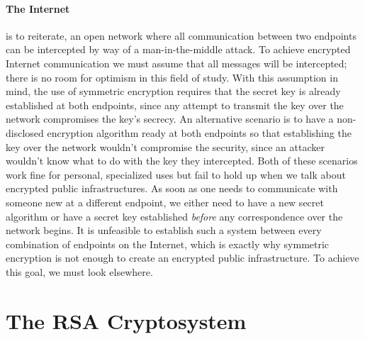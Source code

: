 \documentclass[12pt]{article}
\theoremstyle{remark}
\begin{document}
\paragraph{The Internet} is to reiterate, an open network where all communication between two endpoints can be intercepted by way of a man-in-the-middle attack.  To achieve encrypted Internet communication we must assume that all messages will be intercepted; there is no room for optimism in this field of study.  With this assumption in mind, the use of symmetric encryption requires that the secret key is already established at both endpoints, since any attempt to transmit the key over the network compromises the key's secrecy.  An alternative scenario is to have a non-disclosed encryption algorithm ready at both endpoints so that establishing the key over the network wouldn't compromise the security, since an attacker wouldn't know what to do with the key they intercepted.  Both of these scenarios work fine for personal, specialized uses but fail to hold up when we talk about encrypted public infrastructures.  As soon as one needs to communicate with someone new at a different endpoint, we either need to have a new secret algorithm or have a secret key established \textit{before} any correspondence over the network begins.  It is unfeasible to establish such a system between every combination of endpoints on the Internet, which is exactly why symmetric encryption is not enough to create an encrypted public infrastructure.  To achieve this goal, we must look elsewhere.



\section{The RSA Cryptosystem}
\end{document}
